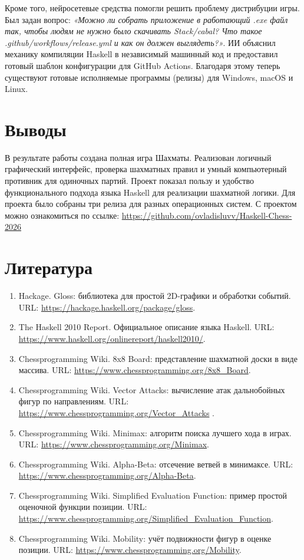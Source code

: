 Кроме того, нейросетевые средства помогли решить проблему дистрибуции игры. Был задан вопрос: \textit{«Можно ли собрать приложение в работающий .exe файл так, чтобы людям не нужно было скачивать Stack/cabal? Что такое .github/workflows/release.yml и как он должен выглядеть?»}. ИИ объяснил механику компиляции Haskell в независимый машинный код и предоставил готовый шаблон конфигурации для GitHub Actions. Благодаря этому теперь существуют готовые исполняемые программы (релизы) для Windows, macOS и Linux.

\section{Выводы}
В результате работы создана полная игра Шахматы. Реализован логичный графический интерфейс, проверка шахматных правил и умный компьютерный противник для одиночных партий. Проект показал пользу и удобство функционального подхода языка Haskell для реализации шахматной логики. Для проекта было собраны три релиза для разных операционных систем.
С проектом можно ознакомиться по ссылке:
\url{https://github.com/ovladisluvv/Haskell-Chess-2026}

\section{Литература}
\begin{enumerate}
    \item Hackage. Gloss: библиотека для простой 2D-графики и обработки событий. URL: \url{https://hackage.haskell.org/package/gloss}.
    \item The Haskell 2010 Report. Официальное описание языка Haskell. URL: \url{https://www.haskell.org/onlinereport/haskell2010/}.
    \item Chessprogramming Wiki. 8x8 Board: представление шахматной доски в виде массива. URL: \url{https://www.chessprogramming.org/8x8_Board}.
    \item Chessprogramming Wiki. Vector Attacks: вычисление атак дальнобойных фигур по направлениям. URL: \url{https://www.chessprogramming.org/Vector_Attacks} .
    \item Chessprogramming Wiki. Minimax: алгоритм поиска лучшего хода в играх. URL: \url{https://www.chessprogramming.org/Minimax}.
    \item Chessprogramming Wiki. Alpha-Beta: отсечение ветвей в минимаксе. URL: \url{https://www.chessprogramming.org/Alpha-Beta}.
    \item Chessprogramming Wiki. Simplified Evaluation Function: пример простой оценочной функции позиции. URL: \url{https://www.chessprogramming.org/Simplified_Evaluation_Function}.
    \item Chessprogramming Wiki. Mobility: учёт подвижности фигур в оценке позиции. URL: \url{https://www.chessprogramming.org/Mobility}.
\end{enumerate}
